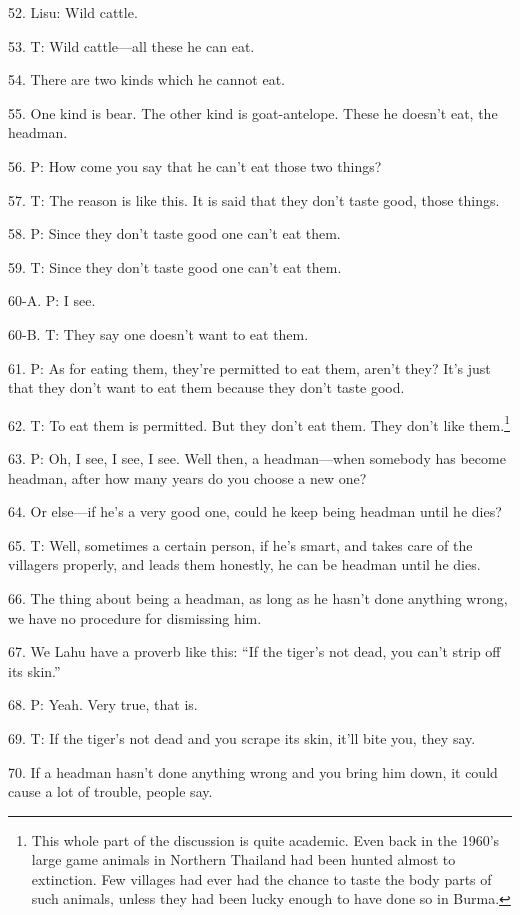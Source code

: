 52. Lisu: Wild cattle.

53. T: Wild cattle---all these he can eat.

54. There are two kinds which he cannot eat.

55. One kind is bear. The other kind is goat-antelope. These he doesn't eat, the
headman.

56. P: How come you say that he can't eat those two things?

57. T: The reason is like this. It is said that they don't taste good, those things.

58. P: Since they don't taste good one can't eat them.

59. T: Since they don't taste good one can't eat them.

60-A. P: I see.

60-B. T: They say one doesn't want to eat them.

61. P: As for eating them, they're permitted to eat them, aren't they? It's just
that they don't want to eat them because they don't taste good.

62. T: To eat them is permitted. But they don't eat them. They don't like them.\footnote{This whole part of the discussion is quite academic. Even back in the 1960's large game animals in Northern Thailand had been hunted almost to extinction. Few villages had ever had the chance to taste the body parts of such animals, unless they had been lucky enough to have done so in Burma.}

63. P: Oh, I see, I see, I see. Well then, a headman---when somebody has become
headman, after how many years do you choose a new one?

64. Or else---if he's a very good one, could he keep being headman until he dies?

65. T: Well, sometimes a certain person, if he's smart, and takes care of the villagers
properly, and leads them honestly, he can be headman until he dies.

66. The thing about being a headman, as long as he hasn't done anything wrong,
we have no procedure for dismissing him.

67. We Lahu have a proverb like this: ``If the tiger's not dead, you can't strip
off its skin.''

68. P: Yeah. Very true, that is.

69. T: If the tiger's not dead and you scrape its skin, it'll bite you, they say.

70. If a headman hasn't done anything wrong and you bring him down, it could cause
a lot of trouble, people say.

